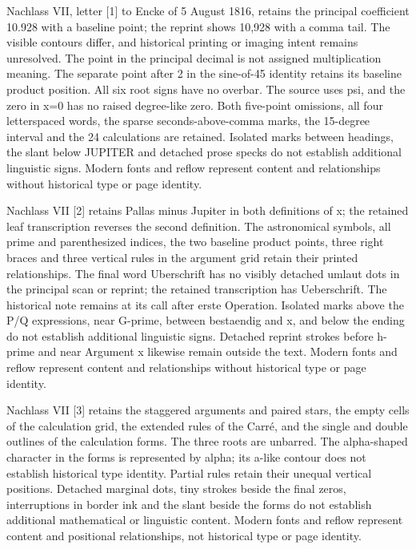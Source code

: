 Nachlass VII, letter [1] to Encke of 5 August 1816, retains the principal coefficient 10.928 with a baseline point; the reprint shows 10,928 with a comma tail. The visible contours differ, and historical printing or imaging intent remains unresolved. The point in the principal decimal is not assigned multiplication meaning. The separate point after 2 in the sine-of-45 identity retains its baseline product position. All six root signs have no overbar. The source uses psi, and the zero in x=0 has no raised degree-like zero. Both five-point omissions, all four letterspaced words, the sparse seconds-above-comma marks, the 15-degree interval and the 24 calculations are retained. Isolated marks between headings, the slant below JUPITER and detached prose specks do not establish additional linguistic signs. Modern fonts and reflow represent content and relationships without historical type or page identity.

Nachlass VII [2] retains Pallas minus Jupiter in both definitions of x; the retained leaf transcription reverses the second definition. The astronomical symbols, all prime and parenthesized indices, the two baseline product points, three right braces and three vertical rules in the argument grid retain their printed relationships. The final word Uberschrift has no visibly detached umlaut dots in the principal scan or reprint; the retained transcription has Ueberschrift. The historical note remains at its call after erste Operation. Isolated marks above the P/Q expressions, near G-prime, between bestaendig and x, and below the ending do not establish additional linguistic signs. Detached reprint strokes before h-prime and near Argument x likewise remain outside the text. Modern fonts and reflow represent content and relationships without historical type or page identity.

Nachlass VII [3] retains the staggered arguments and paired stars, the empty cells of the calculation grid, the extended rules of the Carré, and the single and double outlines of the calculation forms. The three roots are unbarred. The alpha-shaped character in the forms is represented by alpha; its a-like contour does not establish historical type identity. Partial rules retain their unequal vertical positions. Detached marginal dots, tiny strokes beside the final zeros, interruptions in border ink and the slant beside the forms do not establish additional mathematical or linguistic content. Modern fonts and reflow represent content and positional relationships, not historical type or page identity.

